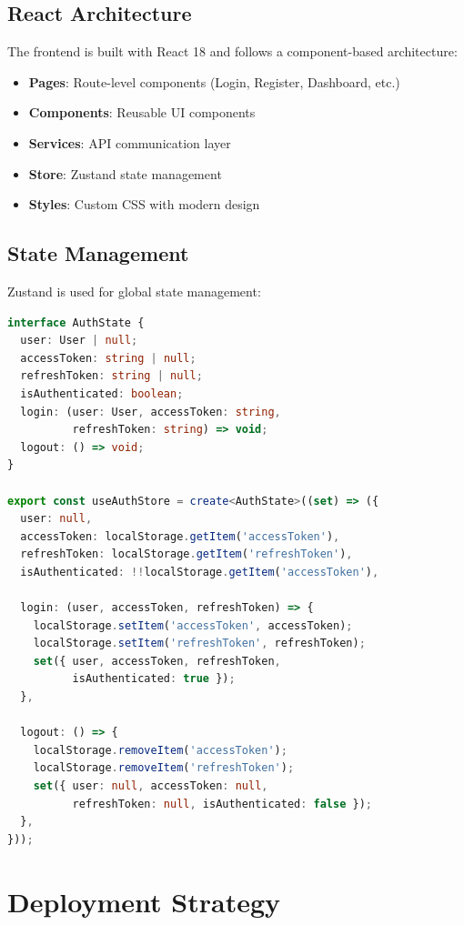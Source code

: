 \documentclass[12pt,a4paper]{article}
\begin{document}
\subsection{React Architecture}

The frontend is built with React 18 and follows a component-based architecture:

\begin{itemize}
    \item \textbf{Pages}: Route-level components (Login, Register, Dashboard, etc.)
    \item \textbf{Components}: Reusable UI components
    \item \textbf{Services}: API communication layer
    \item \textbf{Store}: Zustand state management
    \item \textbf{Styles}: Custom CSS with modern design
\end{itemize}

\subsection{State Management}

Zustand is used for global state management:

\begin{lstlisting}[language=TypeScript, caption=Auth Store Implementation]
interface AuthState {
  user: User | null;
  accessToken: string | null;
  refreshToken: string | null;
  isAuthenticated: boolean;
  login: (user: User, accessToken: string, 
          refreshToken: string) => void;
  logout: () => void;
}

export const useAuthStore = create<AuthState>((set) => ({
  user: null,
  accessToken: localStorage.getItem('accessToken'),
  refreshToken: localStorage.getItem('refreshToken'),
  isAuthenticated: !!localStorage.getItem('accessToken'),
  
  login: (user, accessToken, refreshToken) => {
    localStorage.setItem('accessToken', accessToken);
    localStorage.setItem('refreshToken', refreshToken);
    set({ user, accessToken, refreshToken, 
          isAuthenticated: true });
  },
  
  logout: () => {
    localStorage.removeItem('accessToken');
    localStorage.removeItem('refreshToken');
    set({ user: null, accessToken: null, 
          refreshToken: null, isAuthenticated: false });
  },
}));
\end{lstlisting}

\section{Deployment Strategy}
\end{document}
